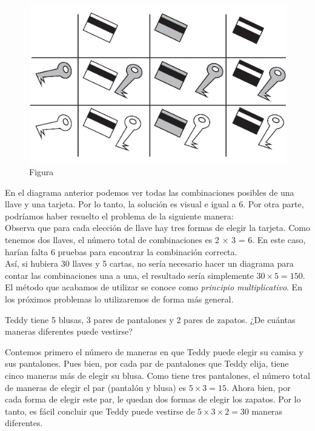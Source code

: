 \documentclass[11pt]{scrartcl}
\begin{document}
\begin{figure}
    \centering
    \includegraphics[scale=.25]{clase_04_llaves_tarjeta.png}
    \caption{Figura}
    \label{fig_1}
\end{figure}

En el diagrama anterior podemos ver todas las combinaciones posibles de una llave y una tarjeta. Por lo tanto, la solución es visual e igual a 6. Por otra parte, podríamos haber resuelto el problema de la siguiente manera:\\

Observa que para cada elección de llave hay tres formas de elegir la tarjeta. Como tenemos dos llaves, el número total de combinaciones es 2 × 3 = 6. En este caso, harían falta 6 pruebas para encontrar la combinación correcta.\\

Así, si hubiera 30 llaves y 5 cartas, no sería necesario hacer un diagrama para contar las combinaciones una a una, el resultado sería simplemente $30 \times 5 = 150$. El método que acabamos de utilizar se conoce como \textit{principio multiplicativo}. En los próximos problemas lo utilizaremos de forma más general.

\begin{example}
Teddy tiene 5 blusas, 3 pares de pantalones y 2 pares de zapatos. ¿De cuántas maneras diferentes puede vestirse?
\end{example}

Contemos primero el número de maneras en que Teddy puede elegir su camisa y sus pantalones. Pues bien, por cada par de pantalones que Teddy elija, tiene cinco maneras más de elegir su blusa. Como tiene tres pantalones, el número total de maneras de elegir el par (pantalón y blusa) es $5 \times 3 = 15$. Ahora bien, por cada forma de elegir este par, le quedan dos formas de elegir los zapatos. Por lo tanto, es fácil concluir que Teddy puede vestirse de $5 \times 3 \times 2 = 30$ maneras diferentes.
\end{document}
